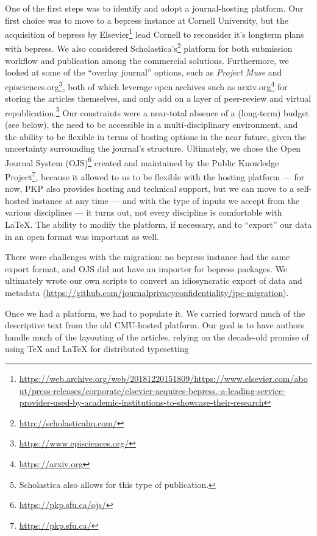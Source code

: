 \documentclass{jpcfinal} %
\newcommand{\urlcite}[2]{#2\footnote{\url{#1}}}
\begin{document}
One of the first steps was to identify and adopt a journal-hosting platform. Our first choice was to move to a bepress instance at Cornell University, but the \urlcite{https://web.archive.org/web/20181220151809/https://www.elsevier.com/about/press-releases/corporate/elsevier-acquires-bepress,-a-leading-service-provider-used-by-academic-institutions-to-showcase-their-research}{acquisition of bepress by Elsevier} lead Cornell to reconsider it's longterm plans with bepress. We also considered  \urlcite{http://scholasticahq.com/}{Scholastica’s}  platform for both submission workflow and publication among the commercial solutions. Furthermore, we looked at some of the ``overlay journal'' options, such as \textit{Project Muse} and \urlcite{https://www.episciences.org/}{episciences.org}, both of which leverage open archives such as \urlcite{https://arxiv.org}{arxiv.org} for storing the articles themselves, and only add on a layer of peer-review and virtual republication.\footnote{Scholastica also allows for this type of publication.} Our constraints were a near-total absence of a (long-term) budget (see below),  the need to be accessible in a multi-disciplinary environment, and the ability to be flexible in terms of hosting options in the near future, given the uncertainty surrounding the journal's structure. Ultimately, we chose the \urlcite{https://pkp.sfu.ca/ojs/}{Open Journal System (OJS)}  created and maintained by the \urlcite{https://pkp.sfu.ca/}{Public Knowledge Project}, because it allowed to us to be flexible with the hosting platform --- for now, PKP also provides hosting and technical support, but we can move to a self-hosted instance at any time --- and with the type of inputs we accept from the various disciplines --- it turns out, not every discipline is comfortable with \LaTeX. The ability to modify the platform, if necessary, and to ``export'' our data in an open format was important as well.

There were challenges with the migration: no bepress instance had the same export format, and OJS did not have an importer for bepress packages. We ultimately wrote our own scripts to convert an idiosyncratic export of data and metadata (\url{https://github.com/journalprivacyconfidentiality/jpc-migration}). 

Once we had a platform, we had to populate it. We carried forward much of the descriptive text from the old CMU-hosted platform. Our goal is to have authors handle much of the layouting of the articles, relying on the decade-old promise of using \TeX  \citep{Knuth1986} and \LaTeX \citep{Lamport1986} for distributed typesetting
\end{document}
